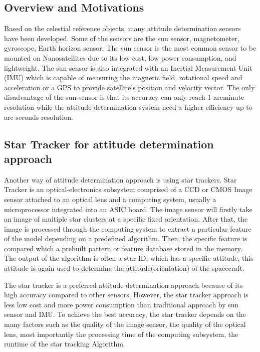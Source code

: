 \subsection{Overview and Motivations}

Based on the celestial reference objects, many attitude determination sensors have been developed. Some of the sensors are the sun sensor, magnetometer, gyroscope, Earth horizon sensor\cite{MDP}. The sun sensor is the most common sensor to be mounted on Nanosatellites due to its low cost, low power consumption, and lightweight. The sun sensor is also integrated with an Inertial Measurement Unit (IMU) which is capable of measuring the magnetic field, rotational speed and acceleration or a GPS to provide satellite’s position and velocity vector. The only disadvantage of the sun sensor is that its accuracy can only reach 1 arcminute resolution while the attitude determination system need a higher efficiency up to arc seconds resolution\cite{edselc.2-52.0-001938469619810101}.

\subsection{Star Tracker for attitude determination approach}

Another way of attitude determination approach is using star trackers. Star Tracker is an optical-electronics subsystem comprised of a CCD or CMOS Image sensor attached to an optical lens and a computing system, usually a microprocessor integrated into an ASIC board. The image sensor will firstly take an image of multiple star clusters at a specific fixed orientation. After that, the image is processed through the computing system to extract a particular feature of the model depending on a predefined algorithm. Then, the specific feature is compared which a prebuilt pattern or feature database stored in the memory. The output of the algorithm is often a star ID, which has a specific attitude, this attitude is again used to determine the attitude(orientation) of the spacecraft. \\


\noindent The star tracker is a preferred attitude determination approach because of its high accuracy compared to other sensors\cite{ntu.19915319780101}. However, the star tracker approach is less low cost and more power consumption than traditional approach by sun sensor and IMU. To achieve the best accuracy, the star tracker depends on the many factors such as the quality of the image sensor, the quality of the optical lens, most importantly the processing time of the computing subsystem, the runtime of the star tracking Algorithm. \\

